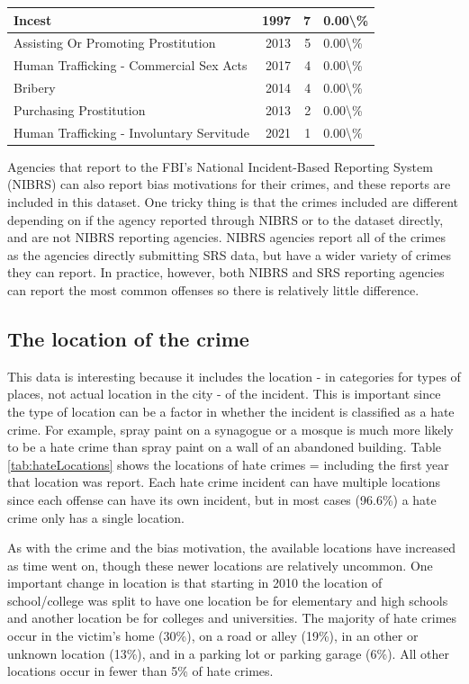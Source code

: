 \documentclass[
]{krantz}
\begin{document}
\begin{longtable}[t]{l|r|r|l}
\hline
Incest & 1997 & 7 & 0.00\textbackslash{}\%\\
\hline
Assisting Or Promoting Prostitution & 2013 & 5 & 0.00\textbackslash{}\%\\
\hline
Human Trafficking - Commercial Sex Acts & 2017 & 4 & 0.00\textbackslash{}\%\\
\hline
Bribery & 2014 & 4 & 0.00\textbackslash{}\%\\
\hline
Purchasing Prostitution & 2013 & 2 & 0.00\textbackslash{}\%\\
\hline
Human Trafficking - Involuntary Servitude & 2021 & 1 & 0.00\textbackslash{}\%\\
\hline
\end{longtable}

Agencies that report to the FBI's National Incident-Based
Reporting System (NIBRS) can also report bias motivations
for their crimes, and these reports are included in this
dataset. One tricky thing is that the crimes included are
different depending on if the agency reported through NIBRS
or to the dataset directly, and are not NIBRS reporting
agencies. NIBRS agencies report all of the crimes as the
agencies directly submitting SRS data, but have a wider
variety of crimes they can report. In practice, however,
both NIBRS and SRS reporting agencies can report the most
common offenses so there is relatively little difference.

\subsection{The location of the
crime}\label{the-location-of-the-crime}

This data is interesting because it includes the location -
in categories for types of places, not actual location in
the city - of the incident. This is important since the type
of location can be a factor in whether the incident is
classified as a hate crime. For example, spray paint on a
synagogue or a mosque is much more likely to be a hate crime
than spray paint on a wall of an abandoned building. Table
\ref{tab:hateLocations} shows the locations of hate crimes =
including the first year that location was report. Each hate
crime incident can have multiple locations since each
offense can have its own incident, but in most cases
(96.6\%) a hate crime only has a single location.

As with the crime and the bias motivation, the available
locations have increased as time went on, though these newer
locations are relatively uncommon. One important change in
location is that starting in 2010 the location of
school/college was split to have one location be for
elementary and high schools and another location be for
colleges and universities. The majority of hate crimes occur
in the victim's home (30\%), on a road or alley (19\%), in
an other or unknown location (13\%), and in a parking lot or
parking garage (6\%). All other locations occur in fewer
than 5\% of hate crimes.
\end{document}
